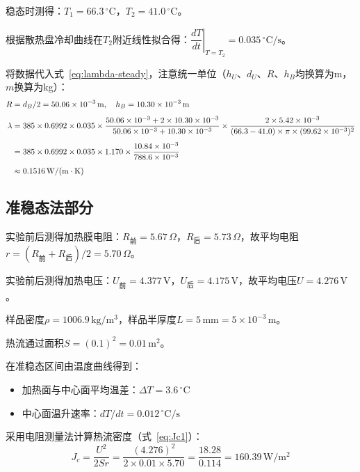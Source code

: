 \documentclass[UTF8]{article}
\begin{document}
稳态时测得：$T_1 = 66.3\,^{\circ}\mathrm{C}$，$T_2 = 41.0\,^{\circ}\mathrm{C}$。

根据散热盘冷却曲线在$T_2$附近线性拟合得：$\left.\dfrac{dT}{dt}\right|_{T=T_2} = 0.035\,^{\circ}\mathrm{C/s}$。

将数据代入式~\eqref{eq:lambda-steady}，注意统一单位（$h_U$、$d_U$、$R$、$h_B$均换算为m，$m$换算为kg）：
\begin{align}
    R &= d_B/2 = 50.06\times10^{-3}\,\mathrm{m},\quad h_B = 10.30\times10^{-3}\,\mathrm{m} \notag\\[4pt]
    \lambda &= 385 \times 0.6992 \times 0.035 \times
    \frac{50.06\times10^{-3} + 2\times 10.30\times10^{-3}}{50.06\times10^{-3} + 10.30\times10^{-3}} \times
    \frac{2\times 5.42\times10^{-3}}{(66.3-41.0)\times\pi\times(99.62\times10^{-3})^2} \notag\\[4pt]
    &= 385\times 0.6992\times 0.035\times 1.170\times\frac{10.84\times10^{-3}}{788.6\times10^{-3}} \notag\\[4pt]
    &\approx 0.1516\,\mathrm{W/(m\cdot K)}
\end{align}

\subsection{准稳态法部分}

实验前后测得加热膜电阻：$R_{\text{前}}=5.67\,\Omega$，$R_{\text{后}}=5.73\,\Omega$，故平均电阻$r = (R_{\text{前}}+R_{\text{后}})/2 = 5.70\,\Omega$。

实验前后测得加热电压：$U_{\text{前}}=4.377\,\mathrm{V}$，$U_{\text{后}}=4.175\,\mathrm{V}$，故平均电压$U = 4.276\,\mathrm{V}$。

样品密度$\rho = 1006.9\,\mathrm{kg/m^3}$，样品半厚度$L = 5\,\mathrm{mm} = 5\times10^{-3}\,\mathrm{m}$。

热流通过面积$S = (0.1)^2 = 0.01\,\mathrm{m^2}$。

在准稳态区间由温度曲线得到：
\begin{itemize}
    \item 加热面与中心面平均温差：$\Delta T = 3.6\,^{\circ}\mathrm{C}$
    \item 中心面温升速率：$dT/dt = 0.012\,^{\circ}\mathrm{C/s}$
\end{itemize}

采用电阻测量法计算热流密度（式~\eqref{eq:Jc1}）：
\begin{equation}
    J_c = \frac{U^2}{2Sr} = \frac{(4.276)^2}{2\times 0.01\times 5.70} = \frac{18.28}{0.114} = 160.39\,\mathrm{W/m^2}
\end{equation}
\end{document}
